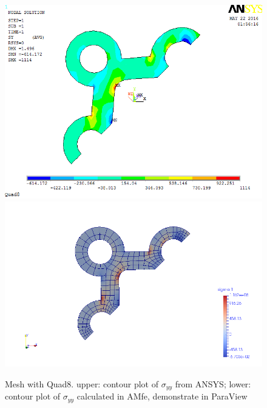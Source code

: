 \begin{figure}[htbp]
	\begin{center}
		\includegraphics[width=13cm,clip]{Quad8_Syy.png} 		
		\includegraphics[width=13cm,clip]{Quad8_Syy_P.png} 		
		\caption{Mesh with Quad8. upper: contour plot of $\sigma_{yy}$ from ANSYS; lower: contour plot of $\sigma_{yy}$ calculated in AMfe, demonstrate in ParaView} \label{fig: Quad8_Syy}
	\end{center}
\end{figure}
\clearpage 

